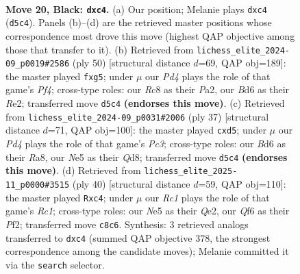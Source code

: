\documentclass[11pt]{article}
\begin{document}
\clearpage

\begin{figure}[p]\centering
\begin{subfigure}{0.46\textwidth}\centering
\resizebox{\linewidth}{!}{%
\newchessgame
\chessboard[
  setfen={2r1r1k1/pp5p/3bpqp1/3pn3/2P5/N1Q3P1/PP2BP1P/R3R1K1 b - - 4 20},
  showmover=false,
  pgfstyle=straightmove, color=movearrow, markmove={d5-c4}
]}
\caption{}
\end{subfigure}\hfill
\begin{subfigure}{0.46\textwidth}\centering
\resizebox{\linewidth}{!}{%
\newchessgame
\chessboard[
  setfen={4r1k1/1p2rp2/p1p3qp/3n2p1/4NP2/6P1/PPQ1R1P1/4R1K1 w - - 5 26},
  showmover=false,
  pgfstyle=straightmove, color=movearrow, markmove={f4-g5}
]}
\caption{}
\end{subfigure}
\\[4pt]
\begin{subfigure}{0.46\textwidth}\centering
\resizebox{\linewidth}{!}{%
\newchessgame
\chessboard[
  setfen={r2q2k1/1p4p1/2p2p1p/p2Prb2/4n3/N3R2P/PPB2PP1/R3Q1K1 b - - 0 19},
  showmover=false,
  pgfstyle=straightmove, color=movearrow, markmove={c6-d5}
]}
\caption{}
\end{subfigure}\hfill
\begin{subfigure}{0.46\textwidth}\centering
\resizebox{\linewidth}{!}{%
\newchessgame
\chessboard[
  setfen={2rr2k1/1p2bpp1/pq2pn1p/8/P1p5/1P2P2P/1B1NQPP1/2RR2K1 w - - 0 21},
  showmover=false,
  pgfstyle=straightmove, color=movearrow, markmove={c1-c4}
]}
\caption{}
\end{subfigure}
\caption{\textbf{Move 20, Black: \texttt{dxc4}.} (a) Our position; Melanie plays \texttt{dxc4} (\texttt{d5c4}). Panels (b)--(d) are the retrieved master positions whose correspondence most drove this move (highest QAP objective among those that transfer to it). (b) Retrieved from \texttt{lichess\_elite\_2024-09\_p0019\#2586} (ply 50) [structural distance $d$=69, QAP obj=189]: the master played \texttt{fxg5}; under $\mu$ our \emph{Pd4} plays the role of that game's \emph{Pf4}; cross-type roles: our \emph{R}c8 as their \emph{P}a2, our \emph{B}d6 as their \emph{R}e2; transferred move \texttt{d5c4} \textbf{(endorses this move)}. (c) Retrieved from \texttt{lichess\_elite\_2024-09\_p0031\#2006} (ply 37) [structural distance $d$=71, QAP obj=100]: the master played \texttt{cxd5}; under $\mu$ our \emph{Pd4} plays the role of that game's \emph{Pc3}; cross-type roles: our \emph{B}d6 as their \emph{R}a8, our \emph{N}e5 as their \emph{Q}d8; transferred move \texttt{d5c4} \textbf{(endorses this move)}. (d) Retrieved from \texttt{lichess\_elite\_2025-11\_p0000\#3515} (ply 40) [structural distance $d$=59, QAP obj=110]: the master played \texttt{Rxc4}; under $\mu$ our \emph{Rc1} plays the role of that game's \emph{Rc1}; cross-type roles: our \emph{N}e5 as their \emph{Q}e2, our \emph{Q}f6 as their \emph{P}f2; transferred move \texttt{c8c6}. Synthesis: 3 retrieved analogs transferred to \texttt{dxc4} (summed QAP objective 378, the strongest correspondence among the candidate moves); Melanie committed it via the \texttt{search} selector.}
\label{fig:thought-m39}
\end{figure}
\end{document}
